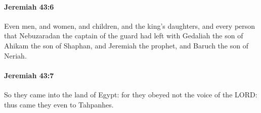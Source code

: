 		\paragraph{Jeremiah 43:6} %
			\label{JEREMIAH-43-6}

			Even men, and women, and children, and the king’s daughters, and every person that Nebuzaradan the captain of the guard had left with Gedaliah the son of Ahikam the son of Shaphan, and Jeremiah the prophet, and Baruch the son of Neriah.


		\paragraph{Jeremiah 43:7} %
			\label{JEREMIAH-43-7}

			So they came into the land of Egypt: for they obeyed not the voice of the LORD: thus came they even to Tahpanhes.


